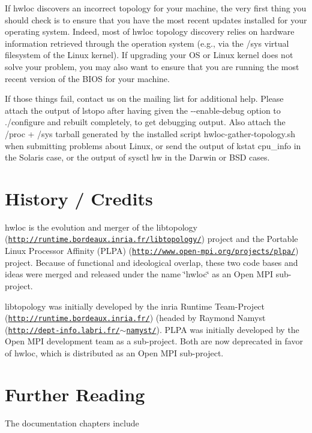 If hwloc discovers an incorrect topology for your machine, the very first thing you should check is to ensure that you have the most recent updates installed for your operating system. Indeed, most of hwloc topology discovery relies on hardware information retrieved through the operation system (e.g., via the /sys virtual filesystem of the Linux kernel). If upgrading your OS or Linux kernel does not solve your problem, you may also want to ensure that you are running the most recent version of the BIOS for your machine.

If those things fail, contact us on the mailing list for additional help. Please attach the output of lstopo after having given the -\/-\/enable-\/debug option to ./configure and rebuilt completely, to get debugging output. Also attach the {\ttfamily /proc} + {\ttfamily /sys} tarball generated by the installed script {\ttfamily hwloc-\/gather-\/topology.sh} when submitting problems about Linux, or send the output of {\ttfamily kstat cpu\_\-info} in the Solaris case, or the output of {\ttfamily sysctl hw} in the Darwin or BSD cases.

 \hypertarget{index_history}{}\section{History / Credits}\label{index_history}
hwloc is the evolution and merger of the libtopology (\href{http://runtime.bordeaux.inria.fr/libtopology/}{\tt http://runtime.bordeaux.inria.fr/libtopology/}) project and the Portable Linux Processor Affinity (PLPA) (\href{http://www.open-mpi.org/projects/plpa/}{\tt http://www.open-\/mpi.org/projects/plpa/}) project. Because of functional and ideological overlap, these two code bases and ideas were merged and released under the name \char`\"{}hwloc\char`\"{} as an Open MPI sub-\/project.

libtopology was initially developed by the inria Runtime Team-\/Project (\href{http://runtime.bordeaux.inria.fr/}{\tt http://runtime.bordeaux.inria.fr/}) (headed by Raymond Namyst (\href{http://dept-info.labri.fr/~namyst/}{\tt http://dept-\/info.labri.fr/$\sim$namyst/}). PLPA was initially developed by the Open MPI development team as a sub-\/project. Both are now deprecated in favor of hwloc, which is distributed as an Open MPI sub-\/project.

 \hypertarget{index_further_read}{}\section{Further Reading}\label{index_further_read}
The documentation chapters include



